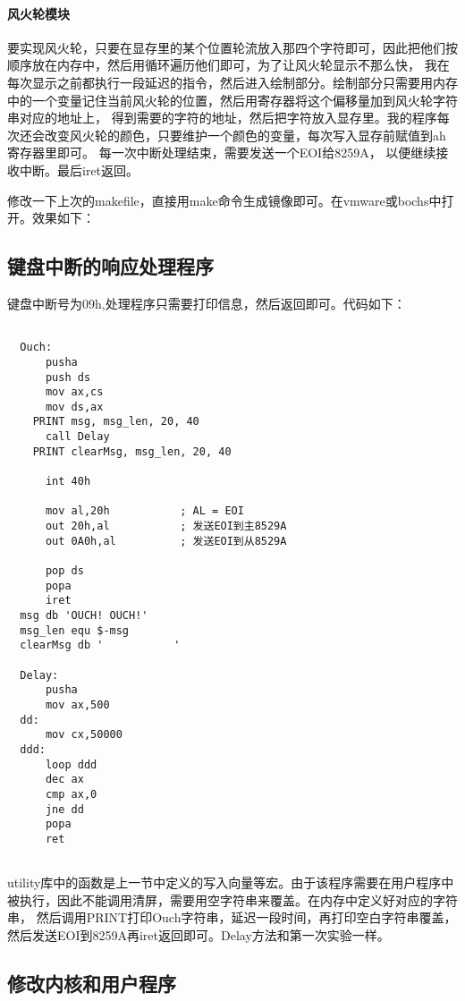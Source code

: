 \documentclass[a4paper, 11pt]{article} %
\begin{document}
\paragraph{风火轮模块}
要实现风火轮，只要在显存里的某个位置轮流放入那四个字符即可，因此把他们按顺序放在内存中，然后用循环遍历他们即可，为了让风火轮显示不那么快，
我在每次显示之前都执行一段延迟的指令，然后进入绘制部分。绘制部分只需要用内存中的一个变量记住当前风火轮的位置，然后用寄存器将这个偏移量加到风火轮字符串对应的地址上，
得到需要的字符的地址，然后把字符放入显存里。我的程序每次还会改变风火轮的颜色，只要维护一个颜色的变量，每次写入显存前赋值到ah寄存器里即可。
每一次中断处理结束，需要发送一个EOI给8259A， 以便继续接收中断。最后iret返回。

修改一下上次的makefile，直接用make命令生成镜像即可。在vmware或bochs中打开。效果如下：


\subsection{键盘中断的响应处理程序}
键盘中断号为09h,处理程序只需要打印信息，然后返回即可。代码如下：

\begin{lstlisting}[language={[x86masm]Assembler},label=ouch.asm,caption=ouch.asm]
  %include "utility.inc"

  Ouch:
      pusha
      push ds
      mov ax,cs
      mov ds,ax
    PRINT msg, msg_len, 20, 40
      call Delay
    PRINT clearMsg, msg_len, 20, 40
      
      int 40h
  
      mov al,20h           ; AL = EOI
      out 20h,al           ; 发送EOI到主8529A
      out 0A0h,al          ; 发送EOI到从8529A
  
      pop ds
      popa
      iret
  msg db 'OUCH! OUCH!'
  msg_len equ $-msg
  clearMsg db '           '
  
  Delay:
      pusha
      mov ax,500
  dd:
      mov cx,50000
  ddd:
      loop ddd
      dec ax
      cmp ax,0
      jne dd
      popa
      ret
  
\end{lstlisting}
utility库中的函数是上一节中定义的写入向量等宏。由于该程序需要在用户程序中被执行，因此不能调用清屏，需要用空字符串来覆盖。在内存中定义好对应的字符串，
然后调用PRINT打印Ouch字符串，延迟一段时间，再打印空白字符串覆盖，然后发送EOI到8259A再iret返回即可。Delay方法和第一次实验一样。

\subsection{修改内核和用户程序}
\end{document}
